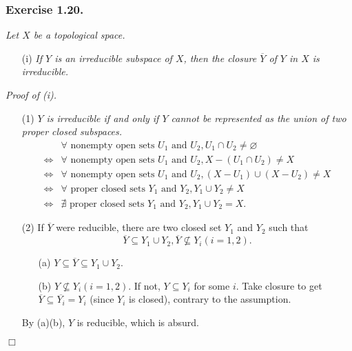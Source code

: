 \documentclass{article}
\begin{document}



\subsubsection*{Exercise 1.20.}
\emph{Let $X$ be a topological space.}
\begin{enumerate}
\item[(i)]
\emph{If $Y$ is an irreducible subspace of $X$, then the closure $\overline{Y}$
of $Y$ in $X$ is irreducible.}
\end{enumerate}

\emph{Proof of (i).}
\begin{enumerate}
\item[(1)]
\emph{$Y$ is irreducible if and only if
$Y$ cannot be represented as the union of two proper closed subspaces.}
  \begin{align*}
  &\forall \text{ nonempty open sets } U_1 \text{ and } U_2,
  U_1 \cap U_2 \neq \varnothing \\
  \Longleftrightarrow&
  \forall \text{ nonempty open sets } U_1 \text{ and } U_2,
  X - (U_1 \cap U_2) \neq X \\
  \Longleftrightarrow&
  \forall \text{ nonempty open sets } U_1 \text{ and } U_2,
  (X - U_1) \cup (X - U_2) \neq X \\
  \Longleftrightarrow&
  \forall \text{ proper closed sets } Y_1 \text{ and } Y_2,
  Y_1 \cup Y_2 \neq X \\
  \Longleftrightarrow&
  \nexists \text{ proper closed sets } Y_1 \text{ and } Y_2,
  Y_1 \cup Y_2 = X.
  \end{align*}
\item[(2)]
If $\overline{Y}$ were reducible, there are two closed set $Y_1$ and $Y_2$
such that
$$\overline{Y} \subseteq Y_1 \cup Y_2,
\overline{Y} \not\subseteq Y_i (i = 1, 2).$$
  \begin{enumerate}
  \item[(a)]
  $Y \subseteq \overline{Y} \subseteq Y_1 \cup Y_2$.
  \item[(b)]
  $Y\not\subseteq Y_i (i = 1, 2)$. If not, $Y \subseteq Y_i$ for some $i$.
  Take closure to get $\overline{Y} \subseteq \overline{Y_i} = Y_i$ (since $Y_i$ is closed),
  contrary to the assumption.
  \end{enumerate}
  By (a)(b), $Y$ is reducible, which is absurd.
\end{enumerate}
$\Box$ \\
\end{document}
